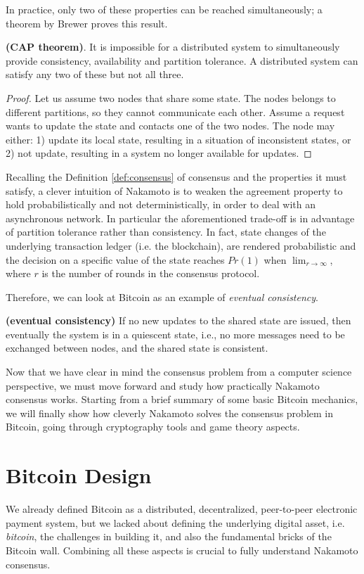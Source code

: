 \bigskip
\noindent
In practice, only two of these properties can be reached simultaneously; a theorem by Brewer proves this result.
\begin{thm} {\bf (CAP theorem)}.
    It is impossible for a distributed system to simultaneously provide consistency, availability and partition tolerance. A distributed system can satisfy any two of these but not all three.
\end{thm}
\begin{proof}
    Let us assume two nodes that share some state. The nodes belongs to different partitions, so they cannot communicate each other. Assume a request wants to update the state and contacts one of the two nodes. The node may either: 1) update its local state, resulting in a situation of inconsistent states, or 2) not update, resulting in a system no longer available for updates.
\end{proof}

\bigskip
\noindent
Recalling the Definition \ref{def:consensus} of consensus and the properties it must satisfy, a clever intuition of Nakamoto is to weaken the agreement property to hold probabilistically and not deterministically, in order to deal with an asynchronous network. In particular the aforementioned trade-off is in advantage of partition tolerance rather than consistency. In fact, state changes of the underlying transaction ledger (i.e. the blockchain), are rendered probabilistic and the decision on a specific value of the state reaches $Pr(1)$ when $\lim_{r \to \infty}$, where $r$ is the number of rounds in the consensus protocol.

\bigskip
\noindent
Therefore, we can look at Bitcoin as an example of \textit{eventual consistency}.
\begin{mydef}{\bf (eventual consistency)}
    If no new updates to the shared state are issued, then eventually the system is in a quiescent state, i.e., no more messages need to be exchanged between nodes, and the shared state is consistent.
\end{mydef}

\bigskip
\noindent
Now that we have clear in mind the consensus problem from a computer science perspective, we must move forward and study how practically Nakamoto consensus works. Starting from a brief summary of some basic Bitcoin mechanics, we will finally show how cleverly Nakamoto solves the consensus problem in Bitcoin, going through cryptography tools and game theory aspects.

\bigskip
\section{Bitcoin Design}
\label{sec:btc-design}
We already defined Bitcoin as a distributed, decentralized, peer-to-peer electronic payment system, but we lacked about defining the underlying digital asset, i.e. \textit{bitcoin}, the challenges in building it, and also the fundamental bricks of the Bitcoin wall. Combining all these aspects is crucial to fully understand Nakamoto consensus.

